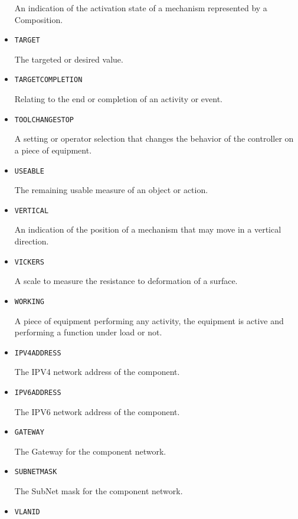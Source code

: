 \begin{itemize}
An indication of the activation state of a mechanism represented by a \gls{Composition}.


\item \texttt{TARGET}  

The targeted or desired value.


\item \texttt{TARGET\textunderscore COMPLETION}  

Relating to the end or completion of an activity or event.


\item \texttt{TOOL\textunderscore CHANGE\textunderscore STOP}  

A setting or operator selection that changes the behavior of the controller on a piece of equipment.


\item \texttt{USEABLE}  

The remaining usable measure of an object or action.


\item \texttt{VERTICAL}  

An indication of the position of a mechanism that may move in a vertical direction.


\item \texttt{VICKERS}  

A scale to measure the resistance to deformation of a surface.


\item \texttt{WORKING}  

A piece of equipment performing any activity, the equipment is active and performing a function under load or not.


\item \texttt{IPV4\textunderscore ADDRESS}  

The IPV4 network address of the component.


\item \texttt{IPV6\textunderscore ADDRESS}  

The IPV6 network address of the component.


\item \texttt{GATEWAY}  

The Gateway for the component network.


\item \texttt{SUBNET\textunderscore MASK}  

The SubNet mask for the component network.



\item \texttt{VLAN\textunderscore ID}  


\end{itemize}
